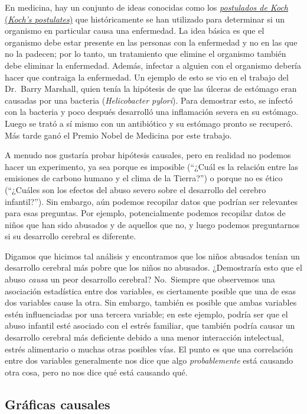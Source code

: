 \documentclass[
  12pt,
]{book}
\begin{document}
En medicina, hay un conjunto de ideas conocidas como los \href{https://en.wikipedia.org/wiki/Koch\%27s_postulates}{\emph{postulados de Koch} (\emph{Koch's postulates})} que históricamente se han utilizado para determinar si un organismo en particular causa una enfermedad. La idea básica es que el organismo debe estar presente en las personas con la enfermedad y no en las que no la padecen; por lo tanto, un tratamiento que elimine el organismo también debe eliminar la enfermedad. Además, infectar a alguien con el organismo debería hacer que contraiga la enfermedad. Un ejemplo de esto se vio en el trabajo del Dr.~Barry Marshall, quien tenía la hipótesis de que las úlceras de estómago eran causadas por una bacteria (\emph{Helicobacter pylori}). Para demostrar esto, se infectó con la bacteria y poco después desarrolló una inflamación severa en su estómago. Luego se trató a sí mismo con un antibiótico y su estómago pronto se recuperó. Más tarde ganó el Premio Nobel de Medicina por este trabajo.

A menudo nos gustaría probar hipótesis causales, pero en realidad no podemos hacer un experimento, ya sea porque es imposible (``¿Cuál es la relación entre las emisiones de carbono humano y el clima de la Tierra?'') o porque no es ético (``¿Cuáles son los efectos del abuso severo sobre el desarrollo del cerebro infantil?''). Sin embargo, aún podemos recopilar datos que podrían ser relevantes para esas preguntas. Por ejemplo, potencialmente podemos recopilar datos de niños que han sido abusados y de aquellos que no, y luego podemos preguntarnos si su desarrollo cerebral es diferente.

Digamos que hicimos tal análisis y encontramos que los niños abusados tenían un desarrollo cerebral más pobre que los niños no abusados. ¿Demostraría esto que el abuso \emph{causa} un peor desarrollo cerebral? No.~Siempre que observemos una asociación estadística entre dos variables, es ciertamente posible que una de esas dos variables cause la otra. Sin embargo, también es posible que ambas variables estén influenciadas por una tercera variable; en este ejemplo, podría ser que el abuso infantil esté asociado con el estrés familiar, que también podría causar un desarrollo cerebral más deficiente debido a una menor interacción intelectual, estrés alimentario o muchas otras posibles vías. El punto es que una correlación entre dos variables generalmente nos dice que algo \emph{probablemente} está causando otra cosa, pero no nos dice qué está causando qué.

\hypertarget{gruxe1ficas-causales}{%
\subsection{Gráficas causales}\label{gruxe1ficas-causales}}
\end{document}

